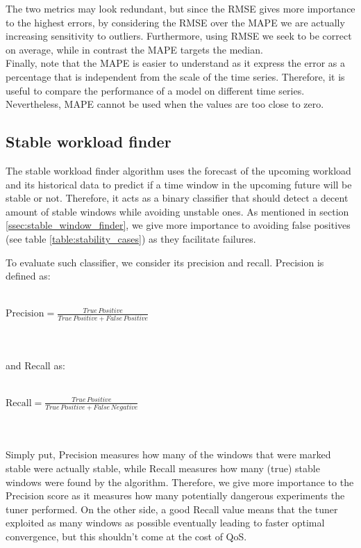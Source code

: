 \documentclass[a4paper, 12pt]{article} %
\begin{document}
	The two metrics may look redundant, but since the RMSE gives more importance to the highest errors, by considering the RMSE over the MAPE we are actually increasing sensitivity to outliers. Furthermore, using RMSE we seek to be correct on average, while in contrast the MAPE targets the median.\\
	Finally, note that the MAPE is easier to understand as it express the error as a percentage that is independent from the scale of the time series. Therefore, it is useful to compare the performance of a model on different time series. Nevertheless, MAPE cannot be used when the values are too close to zero.
	
	\subsection{ Stable workload finder } \label{ssec:exp_stable_wkld_finder}
	The stable workload finder algorithm uses the forecast of the upcoming workload and its historical data to predict if a time window in the upcoming future will be stable or not. Therefore, it acts as a binary classifier that should detect a decent amount of stable windows while avoiding unstable ones. As mentioned in section \ref{ssec:stable_window_finder}, we give more importance to avoiding false positives (see table \ref{table:stability_cases}) as they facilitate failures.
	
	To evaluate such classifier, we consider its precision and recall. Precision is defined as:\\\\
	\centerline{
	$
	\text{Precision} = \frac{ True \, Positive}{ True \, Positive + False \, Positive}
	$
	}\\\\
	and Recall as:\\\\
	\centerline{
		$
		\text{Recall} = \frac{ True \, Positive}{ True \, Positive + False \, Negative}
		$
	}\\\\
	Simply put, Precision measures how many of the windows that were marked stable were actually stable, while Recall measures how many (true) stable windows were found by the algorithm. Therefore, we give more importance to the Precision score as it measures how many potentially dangerous experiments the tuner performed. On the other side, a good Recall value means that the tuner exploited as many windows as possible eventually leading to faster optimal convergence, but this shouldn't come at the cost of QoS.
	
\end{document}
